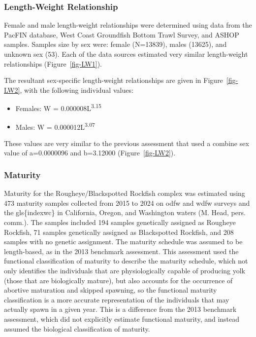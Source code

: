 \documentclass[
]{scrartcl}
\providecommand{\tightlist}{%
  \setlength{\itemsep}{0pt}\setlength{\parskip}{0pt}}\usepackage{longtable,booktabs,array}
\begin{document}
\subsubsection{Length-Weight
Relationship}\label{length-weight-relationship}

Female and male length-weight relationships were determined using data
from the PacFIN database, West Coast Groundfish Bottom Trawl Survey, and
ASHOP samples. Samples size by sex were: female (N=13839), males
(13625), and unknown sex (53). Each of the data sources estimated very
similar length-weight relationships (Figure~\ref{fig-LW1}).

The resultant sex-specific length-weight relationships are given in
Figure~\ref{fig-LW2}, with the following individual values:

\begin{itemize}
\tightlist
\item
  Females: W = 0.000008L\textsuperscript{3.15}
\item
  Males: W = 0.000012L\textsuperscript{3.07}
\end{itemize}

These values are very similar to the previous assessment that used a
combine sex value of a=0.0000096 and b=3.12000 (Figure~\ref{fig-LW2}).

\subsubsection{Maturity}\label{sec-maturity}

Maturity for the Rougheye/Blackspotted Rockfish complex was estimated
using 473 maturity samples collected from 2015 to 2024 on \gls{odfw} and
\gls{wdfw} surveys and the gls\{indexwc\} in California, Oregon, and
Washington waters (M. Head, pers. comm.). The samples included 194
samples genetically assigned as Rougheye Rockfish, 71 samples
genetically assigned as Blackspotted Rockfish, and 208 samples with no
genetic assignment. The maturity schedule was assumed to be
length-based, as in the 2013 benchmark assessment. This assessment used
the functional classification of maturity to describe the maturity
schedule, which not only identifies the individuals that are
physiologically capable of producing yolk (those that are biologically
mature), but also accounts for the occurrence of abortive maturation and
skipped spawning, so the functional maturity classification is a more
accurate representation of the individuals that may actually spawn in a
given year. This is a difference from the 2013 benchmark assessment,
which did not explicitly estimate functional maturity, and instead
assumed the biological classification of maturity.
\end{document}

